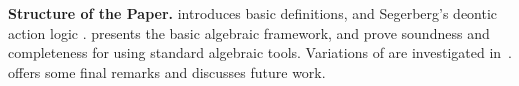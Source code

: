 
\medskip\noindent
\textbf{Structure of the Paper.}  introduces basic definitions, and Segerberg's deontic action logic \DAL.   presents the basic algebraic framework,
and prove soundness and completeness for \DAL
using standard algebraic tools. Variations of \DAL are investigated in~.
 offers some final remarks and discusses
future work.
